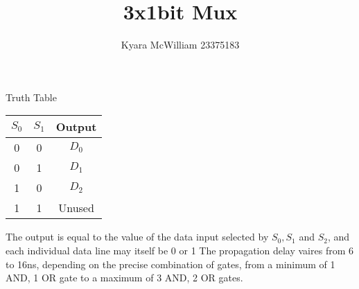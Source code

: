 \documentclass{article}
\title{3x1bit Mux}
\author{Kyara McWilliam 23375183}
\date{}
\begin{document}
\maketitle

Truth Table


\begin{tabular}{ |c|c|c| }
\hline
$S_0$ & $S_1$ & Output \\
\hline
0 & 0 & $D_0$ \\
0 & 1 & $D_1$ \\
1 & 0 & $D_2$ \\ 
1 & 1 & Unused \\
\hline
\end{tabular}

\hfill \break

The output is equal to the value of the data input selected by $S_0, S_1$ and $S_2$, and each individual data line may itself be 0 or 1 \newline
The propagation delay vaires from 6 to 16ns, depending on the precise combination of gates, from a minimum of 1 AND, 1 OR gate to a maximum of 3 AND, 2 OR gates.
\end{document}
